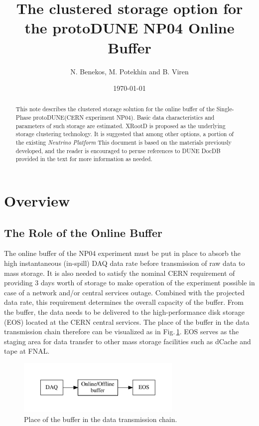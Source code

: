 \documentclass[pdftex,12pt,letter]{article}
\title{The clustered storage option for the protoDUNE NP04 Online Buffer}
\date{\today}
\author{N. Benekos, M. Potekhin and B. Viren}
\newcommand{\pd}{protoDUNE\xspace}
\newcommand{\xrd}{XRootD\xspace}
\begin{document}
\maketitle

\begin{abstract}
\noindent  This note describes the clustered storage
solution for the online buffer of the  Single-Phase \pd (CERN experiment NP04).
Basic data characteristics and  parameters of such storage are estimated. \xrd is proposed as the underlying
storage clustering technology. It is suggested that among other options, a portion of the existing   \textit{Neutrino Platform}
This document is based on the materials previously developed, and the reader is encouraged to peruse references to DUNE DocDB
provided in the text for more information as needed.
\end{abstract}

\section{Overview}
\subsection{The Role of the Online Buffer}
\label{sec:the_role}
The online buffer of the NP04 experiment must be put in place to absorb the high instantaneous (in-spill) DAQ
data rate before transmission of raw data to mass storage. It is also needed to satisfy the nominal CERN requirement of
providing 3 days worth of storage to make operation of the experiment possible in case of a network and/or central services
outage. Combined with the projected data rate, this requirement determines the overall capacity of the buffer. From the buffer,
the data needs to be delivered to the high-performance  disk storage (EOS) located at the CERN central services.
The place of the buffer in the data transmission chain therefore can be visualized as in Fig.\,\ref{fig:big-picture}.
EOS serves as the staging area for data transfer to other mass storage facilities such as dCache and tape at FNAL.
\begin{figure}[tbh]
  \centering
  \includegraphics[width=0.7\textwidth]{figures/big-picture.pdf}
  \caption{Place of the buffer in the data transmission chain.}
  \label{fig:big-picture}
\end{figure}
\end{document}
